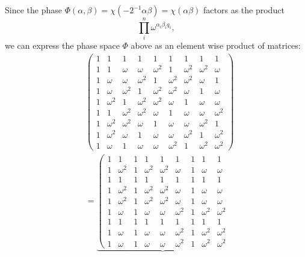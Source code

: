 \documentclass[a4paper]{article}
\begin{document}
  Since the phase $\Phi(\alpha,\beta) =
  \chi(-2^{-1}\alpha\beta) = \chi(\alpha\beta)$ factors as
  the product
  \begin{equation}
    \prod_i^n \omega^{\alpha_i \beta_i q_i},
  \end{equation}
  we can express the phase space $\Phi$ above as an element
  wise product of matrices:
  \begin{align}
    & \left(\begin{array}{rrrrrrrrr}
      1 & 1 & 1 & 1 & 1 & 1 & 1 & 1 & 1 \\
      1 & 1 & \omega & \omega & \omega^{2} & 1 & \omega^{2} & \omega^{2} & \omega \\
      1 & \omega & \omega & \omega^{2} & 1 & \omega^{2} & \omega^{2} & \omega & 1 \\
      1 & \omega & \omega^{2} & 1 & \omega^{2} & \omega^{2} & \omega & 1 & \omega \\
      1 & \omega^{2} & 1 & \omega^{2} & \omega^{2} & \omega & 1 & \omega & \omega \\
      1 & 1 & \omega^{2} & \omega^{2} & \omega & 1 & \omega & \omega & \omega^{2} \\
      1 & \omega^{2} & \omega^{2} & \omega & 1 & \omega & \omega & \omega^{2} & 1 \\
      1 & \omega^{2} & \omega & 1 & \omega & \omega & \omega^{2} & 1 & \omega^{2} \\
      1 & \omega & 1 & \omega & \omega & \omega^{2} & 1 & \omega^{2} & \omega^{2}
      \end{array}\right) \\
    &= \underbrace{
    \left(\begin{array}{rrrrrrrrr}
    1 & 1 & 1 & 1 & 1 & 1 & 1 & 1 & 1 \\
    1 & \omega^{2} & 1 & \omega^{2} & \omega^{2} & \omega & 1 & \omega & \omega \\
    1 & 1 & 1 & 1 & 1 & 1 & 1 & 1 & 1 \\
    1 & \omega^{2} & 1 & \omega^{2} & \omega^{2} & \omega & 1 & \omega & \omega \\
    1 & \omega^{2} & 1 & \omega^{2} & \omega^{2} & \omega & 1 & \omega & \omega \\
    1 & \omega & 1 & \omega & \omega & \omega^{2} & 1 & \omega^{2} & \omega^{2} \\
    1 & 1 & 1 & 1 & 1 & 1 & 1 & 1 & 1 \\
    1 & \omega & 1 & \omega & \omega & \omega^{2} & 1 & \omega^{2} & \omega^{2} \\
    1 & \omega & 1 & \omega & \omega & \omega^{2} & 1 & \omega^{2} & \omega^{2}

\end{array}}
\end{align}
\end{document}
